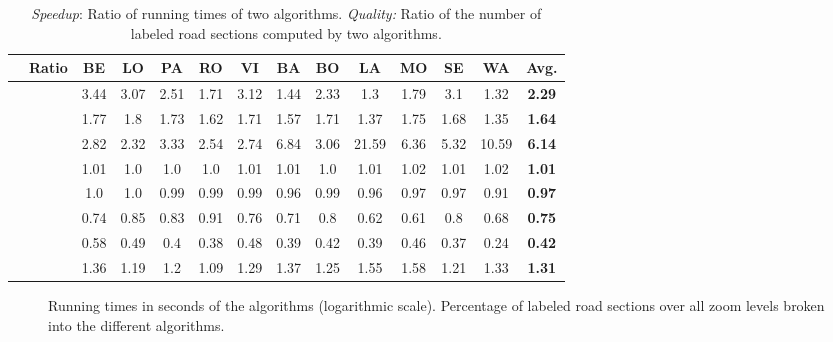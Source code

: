 \documentclass[a4paper,11pt]{article}
\begin{document}
\begin{table}[t]
  \caption{\emph{Speedup}: Ratio of running times of two algorithms. \emph{Quality:} Ratio of the number of labeled road sections computed by two algorithms. }
\label{table:speedup}
\centering
\small
\begin{tabular}{lccccccccccccc}
\toprule
 & Ratio & BE & LO & PA & RO & VI & BA & BO & LA & MO & SE & WA & \textbf{Avg.}\\ \midrule
\parbox[t]{1mm}{}
 &  & 3.44 & 3.07 & 2.51 & 1.71 & 3.12 & 1.44 & 2.33 & 1.3 & 1.79 & 3.1 & 1.32 & \textbf{2.29}\vspace{1ex}\\
 &  & 1.77 & 1.8 & 1.73 & 1.62 & 1.71 & 1.57 & 1.71 & 1.37 & 1.75 & 1.68 & 1.35 & \textbf{1.64}\vspace{1ex}\\
 &  & 2.82 & 2.32 & 3.33 & 2.54 & 2.74 & 6.84 & 3.06 & 21.59 & 6.36 & 5.32 & 10.59 & \textbf{6.14}\vspace{1ex}\\
\midrule
 \parbox[t]{1mm}{}
  &  & 1.01 & 1.0 & 1.0 & 1.0 & 1.01 & 1.01 & 1.0 & 1.01 & 1.02 & 1.01 & 1.02 & \textbf{1.01}\vspace{1ex}\\
 &  & 1.0 & 1.0 & 0.99 & 0.99 & 0.99 & 0.96 & 0.99 & 0.96 & 0.97 & 0.97 & 0.91 & \textbf{0.97}\vspace{1ex}\\
 &  & 0.74 & 0.85 & 0.83 & 0.91 & 0.76 & 0.71 & 0.8 & 0.62 & 0.61 & 0.8 & 0.68 & \textbf{0.75}\vspace{1ex}\\
 &  & 0.58 & 0.49 & 0.4 & 0.38 & 0.48 & 0.39 & 0.42 & 0.39 & 0.46 & 0.37 & 0.24 & \textbf{0.42}\vspace{1ex}\\
 &  & 1.36 & 1.19 & 1.2 & 1.09 & 1.29 & 1.37 & 1.25 & 1.55 & 1.58 & 1.21 & 1.33 & \textbf{1.31}\vspace{1ex}\\
\bottomrule
\end{tabular}
\end{table}


\begin{figure}[t]
\centering
{}
  \centering {}

  \caption{ 
   Running times in seconds of the
    algorithms (logarithmic scale). 
  Percentage of labeled road sections over all  zoom levels broken into the different  algorithms. 
}\vspace{-2ex}
\end{figure}
\end{document}
